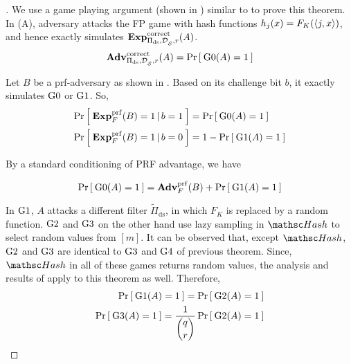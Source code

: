 \begin{proof}[]
We use a game playing argument (shown in ) similar to  to prove this theorem. In (A), adversary attacks the FP game with  hash functions $h_j(x) = F_K(\langle j,x \rangle) $, and hence exactly simulates $\mathrm{\mathbf{Exp}}^{\mathrm{correct}}_{\Pi_{\mathrm{ds}},\mathcal{D}_{{\cal S}}^{},r}(A)$.
\begin{equation}
\mathrm{\mathbf{Adv}}^{\mathrm{correct}}_{\Pi_{\mathrm{ds}},\mathcal{D}_{{\cal S}}^{},r}(A) = \Pr\left[\: \text{G0}(A)=1 \:\right]\label{eq:2T0}
\end{equation}

Let $B$ be a prf-adversary as shown in . Based on its challenge bit $b$, it exactly simulates $\text{G0}$ or $\text{G1}$. So,
\begin{align*}
\Prob{\ExpPRF{F}{B} = 1\,|\,b=1} &= \Prob{\game{0}(A)=1} \\%
\Prob{\ExpPRF{F}{B} = 1\,|\,b=0} &= 1-\Prob{\game{1}(A)=1}
\end{align*}

By a standard conditioning of PRF advantage, we have

\begin{equation*}
\Prob{\game{0}(A)=1} = \AdvPRF{F}{B} + \Prob{\game{1}(A)=1}%
\end{equation*}

In $\text{G1}$, $A$ attacks a different filter $\tilde{\Pi}_\mathrm{ds}$, in which $F_K$ is replaced by a random function. $\text{G2}$ and $\text{G3}$ on the other hand use lazy sampling in $\Hash$ to select random values from $[m]$. It can be observed that, except  $\Hash$, $\text{G2}$ and $\text{G3}$ are identical to $\text{G3}$ and $\text{G4}$ of previous theorem. Since, $\Hash$ in all of these games returns random values, the analysis and results of  apply to this theorem as well. Therefore,
\begin{align*}
\Pr\left[\: \text{G1}(A)=1 \:\right] = \Pr\left[\: \text{G2}(A)=1 \:\right]\\
\Pr\left[\: \text{G3}(A)=1 \:\right] = \frac{1}{\dbinom{q}{r}}\Pr\left[\: \text{G2}(A)=1 \:\right]
\end{align*}


\end{proof}

